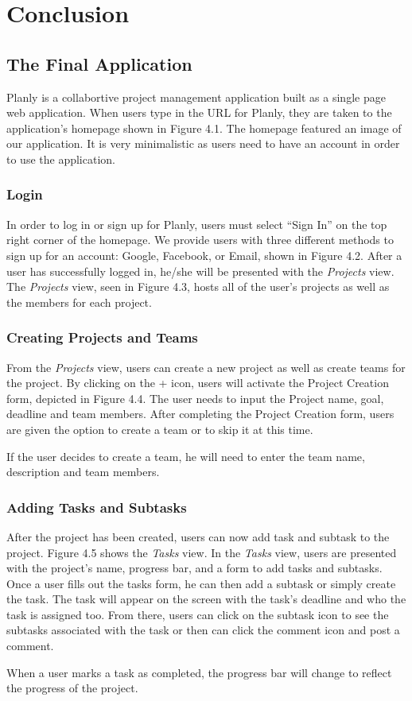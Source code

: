\chapter{Conclusion}

\section{The Final Application}
Planly is a collabortive project management application built as a single page web application. When users type in the URL for Planly, they are taken to the application's homepage shown in Figure 4.1. The homepage featured an image of our application. It is very minimalistic as users need to have an account in order to use the application.
\subsection{Login}
In order to log in or sign up for Planly, users must select ``Sign In'' on the top right corner of the homepage. We provide users with three different methods to sign up for an account: Google, Facebook, or Email, shown in Figure 4.2. After a user has successfully logged in, he/she will be presented with the \emph{Projects} view. The \emph{Projects} view, seen in Figure 4.3, hosts all of the user's projects as well as the members for each project. 
\subsection{Creating Projects and Teams}
From the \emph{Projects} view, users can create a new project as well as create teams for the project. By clicking on the + icon, users will activate the Project Creation form, depicted in Figure 4.4. The user needs to input the Project name, goal, deadline and team members. After completing the Project Creation form, users are given the option to create a team or to skip it at this time. 
\par If the user decides to create a team, he will need to enter the team name, description and team members. 
\subsection{Adding Tasks and Subtasks}
After the project has been created, users can now add task and subtask to the project. Figure 4.5 shows the \emph{Tasks} view. In the \emph{Tasks} view, users are presented with the project's name, progress bar, and a form to add tasks and subtasks. Once a user fills out the tasks form, he can then add a subtask or simply create the task. The task will appear on the screen with the task's deadline and who the task is assigned too. From there, users can click on the subtask icon to see the subtasks associated with the task or then can click the comment icon and post a comment. 
\par When a user marks a task as completed, the progress bar will change to reflect the progress of the project. 


